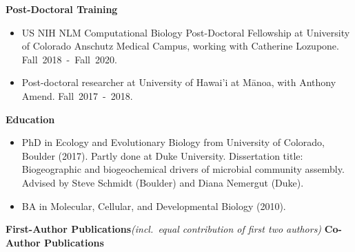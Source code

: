 \documentclass{article}
\begin{document}
\vspace{2mm}
%
{\large  \textbf{Post-Doctoral Training}}
\begin{adjustwidth}{5mm}{}
  \begin{itemize}[noitemsep,topsep=0pt, leftmargin=5mm]
    \item US NIH NLM Computational Biology Post-Doctoral Fellowship at University of Colorado Anschutz Medical Campus, working with Catherine Lozupone. \mbox{Fall 2018 - Fall 2020.}
    \item Post-doctoral researcher at University of Hawai'i at Mānoa, with Anthony Amend. \mbox{Fall 2017 - 2018.}
  \end{itemize}
\end{adjustwidth}
%
\vspace{2mm}
{\large  \textbf{Education}}
\begin{adjustwidth}{5mm}{}
  \begin{itemize}[noitemsep,topsep=0pt, leftmargin=5mm]
    \item PhD in Ecology and Evolutionary Biology from University of Colorado, Boulder (2017). Partly done at Duke University. Dissertation title: Biogeographic and biogeochemical drivers of microbial community assembly. Advised by Steve Schmidt (Boulder) and Diana Nemergut (Duke). 
    \item BA in Molecular, Cellular, and Developmental Biology (2010).
  \end{itemize}
\end{adjustwidth}


\vspace{2mm}
{\large  \textbf{First-Author Publications}}\space\emph{(incl.\ equal contribution of first two authors)}
\vspace{-1em}\vspace{1mm}
\begingroup
  \setlength\bibitemsep{0pt}
  \nocite{*}
  \printbibliography[keyword=firstauthor, heading=none]
\endgroup
\vspace{-1em}\vspace{3mm}
{\large  \textbf{Co-Author Publications}}
\vspace{-1em}\vspace{1mm}
\begingroup
  \setlength\bibitemsep{0pt}
  \nocite{*}
  \printbibliography[keyword=coauthor, heading=none]
\endgroup
\end{document}

